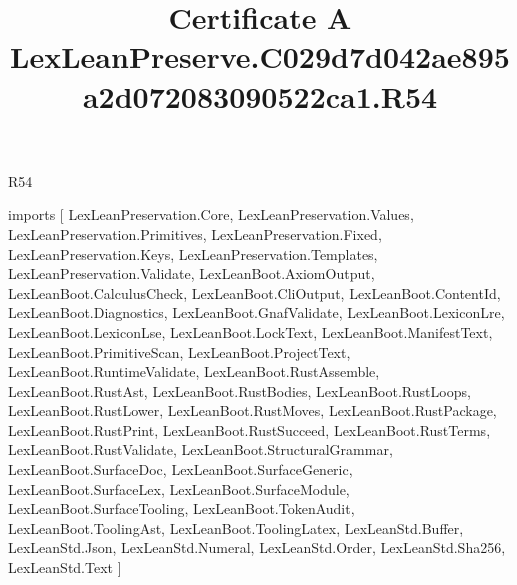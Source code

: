 \begin{lexlean}{R54}
\title{Certificate A LexLeanPreserve.C029d7d042ae895a2d072083090522ca1.R54}
\begin{coremodule}
imports [
  LexLeanPreservation.Core,
  LexLeanPreservation.Values,
  LexLeanPreservation.Primitives,
  LexLeanPreservation.Fixed,
  LexLeanPreservation.Keys,
  LexLeanPreservation.Templates,
  LexLeanPreservation.Validate,
  LexLeanBoot.AxiomOutput,
  LexLeanBoot.CalculusCheck,
  LexLeanBoot.CliOutput,
  LexLeanBoot.ContentId,
  LexLeanBoot.Diagnostics,
  LexLeanBoot.GnafValidate,
  LexLeanBoot.LexiconLre,
  LexLeanBoot.LexiconLse,
  LexLeanBoot.LockText,
  LexLeanBoot.ManifestText,
  LexLeanBoot.PrimitiveScan,
  LexLeanBoot.ProjectText,
  LexLeanBoot.RuntimeValidate,
  LexLeanBoot.RustAssemble,
  LexLeanBoot.RustAst,
  LexLeanBoot.RustBodies,
  LexLeanBoot.RustLoops,
  LexLeanBoot.RustLower,
  LexLeanBoot.RustMoves,
  LexLeanBoot.RustPackage,
  LexLeanBoot.RustPrint,
  LexLeanBoot.RustSucceed,
  LexLeanBoot.RustTerms,
  LexLeanBoot.RustValidate,
  LexLeanBoot.StructuralGrammar,
  LexLeanBoot.SurfaceDoc,
  LexLeanBoot.SurfaceGeneric,
  LexLeanBoot.SurfaceLex,
  LexLeanBoot.SurfaceModule,
  LexLeanBoot.SurfaceTooling,
  LexLeanBoot.TokenAudit,
  LexLeanBoot.ToolingAst,
  LexLeanBoot.ToolingLatex,
  LexLeanStd.Buffer,
  LexLeanStd.Json,
  LexLeanStd.Numeral,
  LexLeanStd.Order,
  LexLeanStd.Sha256,
  LexLeanStd.Text
]


\end{coremodule}
\end{lexlean}
